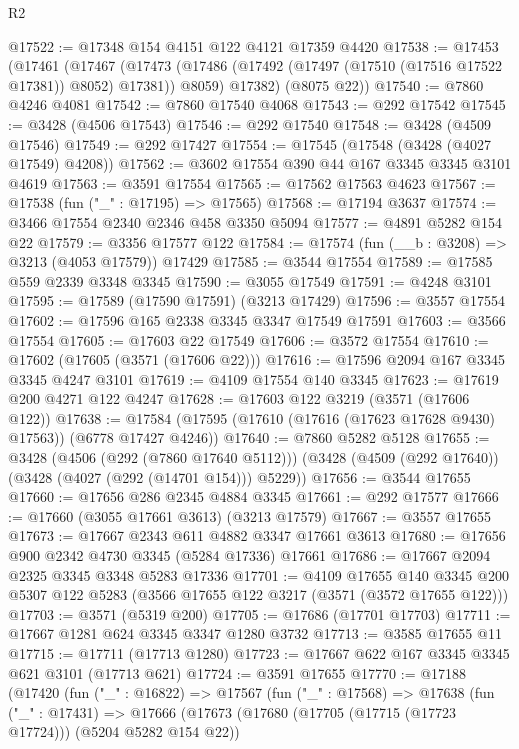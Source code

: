 \begin{lexlean}{R2}
\begin{coremodule}
@17522 := @17348 @154 @4151 @122 @4121 @17359 @4420
@17538 := @17453
    (@17461
      (@17467
        (@17473 (@17486 (@17492 (@17497 (@17510 (@17516 @17522 @17381)) @8052) @17381)) @8059)
        @17382)
      (@8075 @22))
@17540 := @7860 @4246 @4081
@17542 := @7860 @17540 @4068
@17543 := @292 @17542
@17545 := @3428 (@4506 @17543)
@17546 := @292 @17540
@17548 := @3428 (@4509 @17546)
@17549 := @292 @17427
@17554 := @17545 (@17548 (@3428 (@4027 @17549) @4208))
@17562 := @3602 @17554 @390 @44 @167 @3345 @3345 @3101 @4619
@17563 := @3591 @17554
@17565 := @17562 @17563 @4623
@17567 := @17538 (fun ("_" : @17195) => @17565)
@17568 := @17194 @3637
@17574 := @3466 @17554 @2340 @2346 @458 @3350 @5094
@17577 := @4891 @5282 @154 @22
@17579 := @3356 @17577 @122
@17584 := @17574 (fun (__b : @3208) => @3213 (@4053 @17579)) @17429
@17585 := @3544 @17554
@17589 := @17585 @559 @2339 @3348 @3345
@17590 := @3055 @17549
@17591 := @4248 @3101
@17595 := @17589 (@17590 @17591) (@3213 @17429)
@17596 := @3557 @17554
@17602 := @17596 @165 @2338 @3345 @3347 @17549 @17591
@17603 := @3566 @17554
@17605 := @17603 @22 @17549
@17606 := @3572 @17554
@17610 := @17602 (@17605 (@3571 (@17606 @22)))
@17616 := @17596 @2094 @167 @3345 @3345 @4247 @3101
@17619 := @4109 @17554 @140 @3345
@17623 := @17619 @200 @4271 @122 @4247
@17628 := @17603 @122 @3219 (@3571 (@17606 @122))
@17638 := @17584 (@17595 (@17610 (@17616 (@17623 @17628 @9430) @17563)) (@6778 @17427 @4246))
@17640 := @7860 @5282 @5128
@17655 := @3428
    (@4506 (@292 (@7860 @17640 @5112)))
    (@3428 (@4509 (@292 @17640)) (@3428 (@4027 (@292 (@14701 @154))) @5229))
@17656 := @3544 @17655
@17660 := @17656 @286 @2345 @4884 @3345
@17661 := @292 @17577
@17666 := @17660 (@3055 @17661 @3613) (@3213 @17579)
@17667 := @3557 @17655
@17673 := @17667 @2343 @611 @4882 @3347 @17661 @3613
@17680 := @17656 @900 @2342 @4730 @3345 (@5284 @17336) @17661
@17686 := @17667 @2094 @2325 @3345 @3348 @5283 @17336
@17701 := @4109
    @17655
    @140
    @3345
    @200
    @5307
    @122
    @5283
    (@3566 @17655 @122 @3217 (@3571 (@3572 @17655 @122)))
@17703 := @3571 (@5319 @200)
@17705 := @17686 (@17701 @17703)
@17711 := @17667 @1281 @624 @3345 @3347 @1280 @3732
@17713 := @3585 @17655 @11
@17715 := @17711 (@17713 @1280)
@17723 := @17667 @622 @167 @3345 @3345 @621 @3101 (@17713 @621)
@17724 := @3591 @17655
@17770 := @17188
    (@17420
      (fun ("_" : @16822) =>
      @17567
        (fun ("_" : @17568) =>
        @17638
          (fun ("_" : @17431) =>
          @17666
            (@17673
              (@17680 (@17705 (@17715 (@17723 @17724))) (@5204 @5282 @154 @22))

\end{coremodule}
\end{lexlean}
